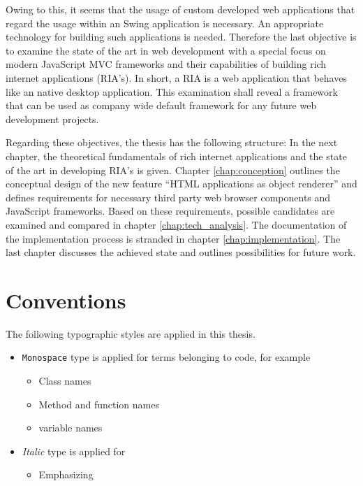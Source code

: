 Owing to this, it seems that the usage of custom developed web applications that regard the usage within an Swing application is necessary.
An appropriate technology for building such applications is needed.
Therefore the last objective is to examine the state of the art in web development with a special focus on modern JavaScript MVC frameworks and their capabilities of building rich internet applications (RIA's).
In short, a RIA is a web application that behaves like an native desktop application.
This examination shall reveal a framework that can be used as company wide default framework for any future web development projects.

Regarding these objectives, the thesis has the following structure: In the next chapter, the theoretical fundamentals of rich internet applications and the state of the art in developing RIA's is given.
Chapter \ref{chap:conception} outlines the conceptual design of the new feature \enquote{HTML applications as object renderer} and defines requirements for necessary third party web browser components and JavaScript frameworks.
Based on these requirements, possible candidates are examined and compared in chapter \ref{chap:tech_analysis}.
The documentation of the implementation process is stranded in chapter \ref{chap:implementation}.
The last chapter discusses the achieved state and outlines possibilities for future work.\\[10mm]
 
\section{Conventions}

The following typographic styles are applied in this thesis.

\begin{itemize}
\item \texttt{Monospace} type is applied for terms belonging to code, for example
	\begin{itemize}
		\item Class names
		\item Method and function names
		\item variable names
	\end{itemize}
\item \emph{Italic} type is applied for
	\begin{itemize}
		\item Emphasizing
	\end{itemize}
\end{itemize}
